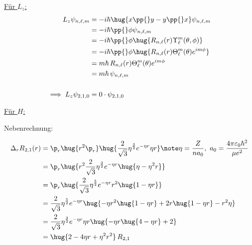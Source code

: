 \documentclass[ex,minted]{exercise_4.0}
\begin{document}
\underline{Für \(L_z\):}
\begin{align*}
    L_z \psi_{n,\ell,m}
    &= -i\hbar\hug{x\pp{}y - y \pp{}x} \psi_{n, \ell,m} \\
    &= -i\hbar \pp{}\phi \psi_{n,\ell,m} \\
    &= -i\hbar \pp{}\phi \hug{R_{n,\ell}(r) \Upsilon_\ell^m(\theta,\phi)}\\
    &= -i\hbar \pp{}\phi \hug{R_{n,\ell}(r) \Theta_\ell^m(\theta) e^{im\phi}}\\
    &= m \hbar\,  R_{n,\ell}(r) \Theta_\ell^m(\theta) e^{im\phi}\\
    &= m \hbar\, \psi_{n,\ell,m}\\
    \\
    \implies L_z \psi_{2,1,0} &= 0 \cdot \psi_{2,1,0} 
\end{align*}

\underline{Für \(H\):}

Nebenrechnung:

\begin{align*}
    \Delta_r R_{2,1}(r) &= \p_r \hug{r^2 \p_r} \hug{\frac{2}{\sqrt3} \eta^{\frac32} e^{-\eta r}\eta r}\note \eta = \frac{Z}{n a_0},\ a_0 = \frac{4\pi \varepsilon_0\hbar^2}{\mu e^2}\\
    &= \p_r \hug{r^2 \frac{2}{\sqrt3} \eta^{\frac32} e^{-\eta r}\hug{\eta  - \eta^2 r}}\\
    &= \p_r \hug{ \frac{2}{\sqrt3} \eta^{\frac52} e^{-\eta r}  r^2 \hug{1-\eta  r}}\\
    &=  \frac{2}{\sqrt3} \eta^{\frac52} e^{-\eta r}  \hug{-\eta r^2 \hug{1-\eta r } + 2r \hug{1-\eta r} - r^2\eta}\\
    &=  \frac{2}{\sqrt3} \eta^{\frac32} e^{-\eta r} \eta r \hug{-\eta r \hug{4 -\eta r} + 2}\\
    &=  \hug{2 - 4 \eta r+ \eta^2 r^2} \, R_{2,1}\\
\end{align*}
\end{document}
